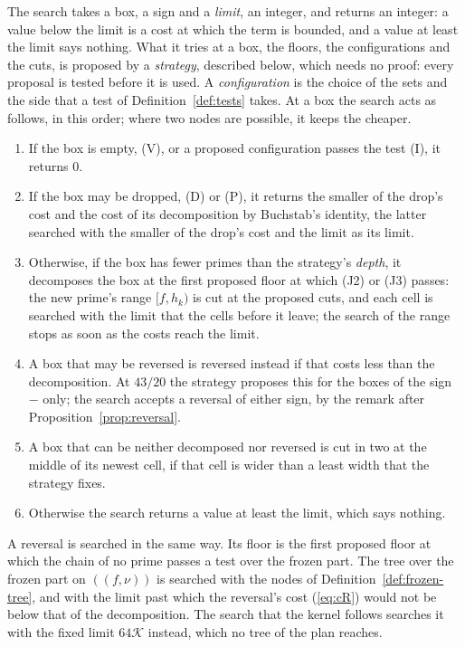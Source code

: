 \documentclass[11pt]{article}
\theoremstyle{definition}
\begin{document}
The search takes a box, a sign and a \emph{limit}, an integer, and returns an integer: a value below the limit is a
cost at which the term is bounded, and a value at least the limit says nothing. What it tries at a box, the floors,
the configurations and the cuts, is proposed by a \emph{strategy}, described below, which needs no proof: every
proposal is tested before it is used. A \emph{configuration} is the choice of the sets and the side that a test of
Definition~\ref{def:tests} takes. At a box the search acts as follows, in this order; where two nodes are possible, it
keeps the cheaper.
\begin{enumerate}
\item If the box is empty, (V), or a proposed configuration passes the test (I), it returns $0$.
\item If the box may be dropped, (D) or (P), it returns the smaller of the drop's cost and the cost of its decomposition
  by Buchstab's identity, the latter searched with the smaller of the drop's cost and the limit as its limit.
\item Otherwise, if the box has fewer primes than the strategy's \emph{depth}, it decomposes the box at the first
  proposed floor at which (J2) or (J3) passes: the new prime's range $[f, h_k)$ is cut at the proposed cuts, and each
  cell is searched with the limit that the cells before it leave; the search of the range stops as soon as the costs
  reach the limit.
\item A box that may be reversed is reversed instead if that costs less than the decomposition. At $43/20$ the
  strategy proposes this for the boxes of the sign $-$ only; the search accepts a reversal of either sign, by the
  remark after Proposition~\ref{prop:reversal}.
\item A box that can be neither decomposed nor reversed is cut in two at the middle of its newest cell, if that cell
  is wider than a least width that the strategy fixes.
\item Otherwise the search returns a value at least the limit, which says nothing.
\end{enumerate}
A reversal is searched in the same way. Its floor is the first proposed floor at which the chain of no prime passes a
test over the frozen part. The tree over the frozen part on $((f, \nu))$ is searched with the nodes of
Definition~\ref{def:frozen-tree}, and with the limit past which the reversal's cost (\ref{eq:cR}) would not be below
that of the decomposition. The search that the kernel follows searches it with the fixed limit $64\mathcal K$
instead, which no tree of the plan reaches.
\end{document}
